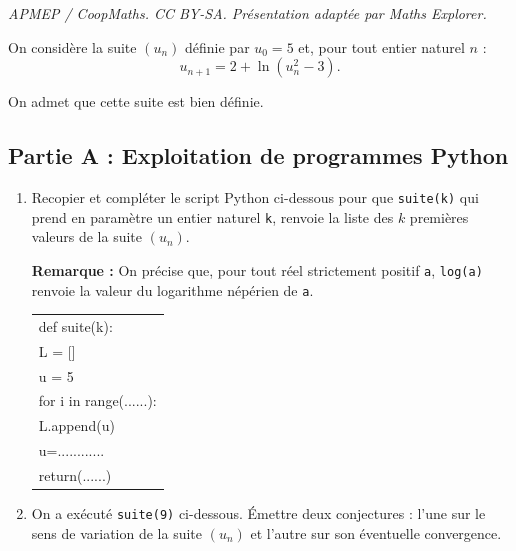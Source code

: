 \documentclass[10pt]{article}
\begin{document}
\noindent\textit{APMEP / CoopMaths. CC BY-SA. Présentation adaptée par Maths Explorer.}\par\medskip
\medskip
	On considère la suite $(u_{n})$ définie par $u_{0}=5$ et, pour tout entier naturel $n$ :
	$$
	u_{n+1}=2+\ln \left(u_{n}^{2}-3\right).
	$$

	On admet que cette suite est bien définie.

	\subsection*{Partie A : Exploitation de programmes Python}

	\begin{enumerate}
		\item Recopier et compléter le script Python ci-dessous pour que \texttt{suite(k)} qui prend en paramètre un entier naturel \texttt{k}, renvoie la liste des $k$ premières valeurs de la suite $(u_{n})$.

		\medskip

		\textbf{Remarque :} On précise que, pour tout réel strictement positif \texttt{a}, \texttt{log(a)} renvoie la valeur du logarithme népérien de \texttt{a}.















		\begin{center}
		\begin{ttfamily}
		\begin{tabularx}{0.6\linewidth}{|X|}\hline
			def suite(k):\\
			\quad	L = []\\
			\quad	u = 5\\
			\quad	for i in range(......):\\
			\qquad	L.append(u)\\
			\qquad	u=............\\
			\quad	return(......)\\ \hline
		\end{tabularx}
		\end{ttfamily}
		\end{center}
		
		\item On a exécuté \texttt{suite(9)} ci-dessous. Émettre deux conjectures : l'une sur le sens de variation de la suite $(u_{n})$ et l'autre sur son éventuelle convergence.


\end{enumerate}
\end{document}
